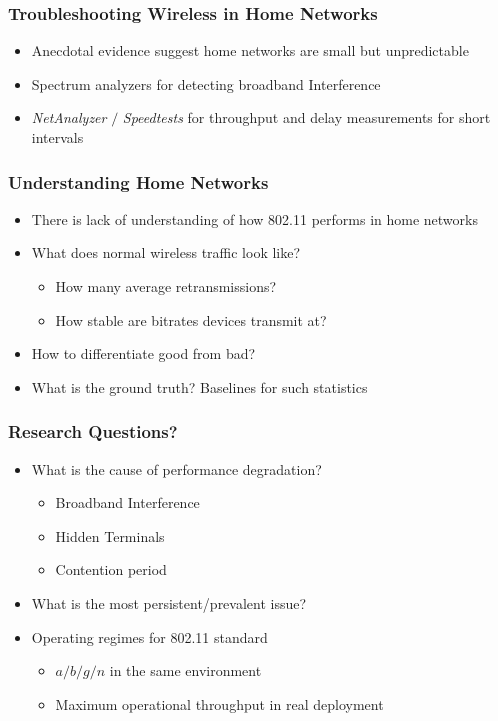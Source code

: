 \documentclass{beamer}
\begin{document}
\begin{frame}
  \frametitle{Troubleshooting Wireless in Home Networks}
    \begin{itemize} 
    \item Anecdotal evidence suggest home networks are small but unpredictable
    \item Spectrum analyzers for detecting broadband Interference
    \item \textit{NetAnalyzer} $/$ \textit{Speedtests} for throughput and delay measurements for short intervals
    \end{itemize}
\end{frame}

\begin{frame}
  \frametitle{Understanding Home Networks} 
    \begin{itemize} 
      \item There is lack of understanding of how 802.11 performs in home networks
      \item What does normal wireless traffic look like?
        \begin{itemize}
          \item How many average retransmissions?
          \item How stable are bitrates devices transmit at?
        \end{itemize}
        \item How to differentiate good from bad?
        \item What is the ground truth? Baselines for such statistics
    \end{itemize}
\end{frame}

\begin{frame}
  \frametitle{Research Questions?} 
  \begin{itemize} 
  \item What is the cause of performance degradation?
    \begin{itemize} 
    \item Broadband Interference
    \item Hidden Terminals
    \item Contention period
    \end{itemize}
  \item What is the most persistent/prevalent issue?
  \item Operating regimes for 802.11 standard
    \begin{itemize} 
    \item $a/b/g/n$ in the same environment  
    \item Maximum operational throughput  in real deployment
    \end{itemize}
  \end{itemize}
\end{frame}
\end{document}
